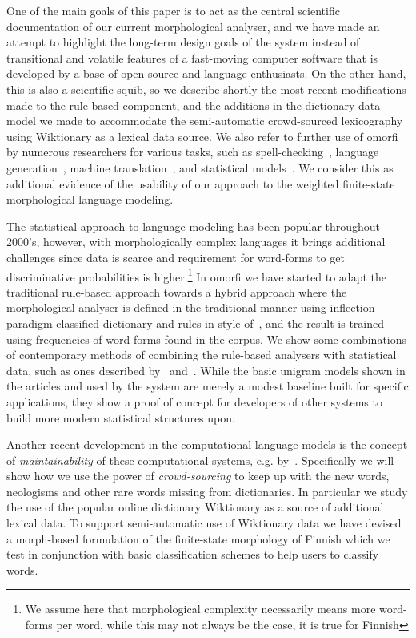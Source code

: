 \documentclass[a4paper,12pt]{article}
\begin{document}
One of the main goals of this paper is to act as the central scientific
documentation of our current morphological analyser, and we have made an
attempt to highlight the long-term design goals of the system instead of
transitional and volatile features of a fast-moving computer software that is
developed by a base of open-source and language enthusiasts. On the other hand,
this is also a scientific squib, so we describe shortly the most recent
modifications made to the rule-based component, and the additions in the
dictionary data model we made to accommodate the semi-automatic crowd-sourced
lexicography using Wiktionary as a lexical data source.  We also refer to
further use of omorfi by numerous researchers for various tasks, such as
spell-checking~\citep{pirinen2014weighted}, language
generation~\citep{toivanen2012corpus}, machine
translation~\cite{clifton2011combining}, and statistical
models~\citep{haverinen2013building,bohnet2013joint}.  We consider this as
additional evidence of the usability of our approach to the weighted
finite-state morphological language modeling.

The statistical approach to language modeling has been popular throughout
2000's, however, with morphologically complex languages it brings additional
challenges since data is scarce and requirement for word-forms to get
discriminative probabilities is higher.\footnote{We assume here that
morphological complexity necessarily means more word-forms per word, while this
may not always be the case, it is true for Finnish} In omorfi we have started
to adapt the traditional rule-based approach towards a hybrid approach where
the morphological analyser is defined in the traditional manner using
inflection paradigm classified dictionary and rules in style
of~\citet{koskenniemi1983twolevel}, and the result is trained using frequencies
of word-forms found in the corpus. We show some combinations of contemporary
methods of combining the rule-based analysers with statistical data, such as
ones described by~\citet{pirinen2009weighted} and~\citet{pirinen2012improving}.
While the basic unigram models shown in the articles and used by the system are
merely a modest baseline built for specific applications, they show a proof of
concept for developers of other systems to build more modern statistical
structures upon.


Another recent development in the computational language models is the concept
of \emph{maintainability} of these computational systems, e.g.
by~\cite{maxwell2008joint,pirinen2011modularisation}. Specifically we will show
how we use the power of \emph{crowd-sourcing} to keep up with the new words,
neologisms and other rare words missing from dictionaries. In particular we
study the use of the popular online dictionary Wiktionary as a source of
additional lexical data. To support semi-automatic use of Wiktionary data we
have devised a morph-based formulation of the finite-state morphology of
Finnish which we test in conjunction with basic classification schemes to help
users to classify words.
\end{document}

